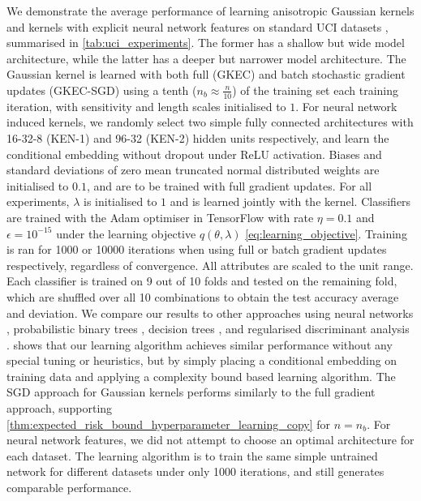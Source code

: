 \documentclass{article}
\begin{document}
		We demonstrate the average performance of learning anisotropic Gaussian kernels and kernels with explicit neural network features on standard UCI datasets \citep{bache2013uci}, summarised in \cref{tab:uci_experiments}. The former has a shallow but wide model architecture, while the latter has a deeper but narrower model architecture. The Gaussian kernel is learned with both full (GKEC) and batch stochastic gradient updates (GKEC-SGD) using a tenth ($n_{b} \approx \frac{n}{10}$) of the training set each training iteration, with sensitivity and length scales initialised to $1$. For neural network induced kernels, we randomly select two simple fully connected architectures with 16-32-8 (KEN-1) and 96-32 (KEN-2) hidden units respectively, and learn the conditional embedding without dropout under ReLU activation. Biases and standard deviations of zero mean truncated normal distributed weights are initialised to $0.1$, and are to be trained with full gradient updates. For all experiments, $\lambda$ is initialised to $1$ and is learned jointly with the kernel. Classifiers are trained with the Adam optimiser \citep{kingma2014adam} in TensorFlow \citep{abadi2016tensorflow} with rate $\eta = 0.1$ and $\epsilon = 10^{-15}$ under the learning objective $q(\theta, \lambda)$ \eqref{eq:learning_objective}. Training is ran for 1000 or 10000 iterations when using full or batch gradient updates respectively, regardless of convergence. All attributes are scaled to the unit range. Each classifier is trained on 9 out of 10 folds and tested on the remaining fold, which are shuffled over all 10 combinations to obtain the test accuracy average and deviation. We compare our results to other approaches using neural networks \citep[a; c]{kaya2016banknote, freire2009short}, probabilistic binary trees \citep[b]{horton1996probabilistic}, decision trees \citep[d]{zhou2004size}, and regularised discriminant analysis \citep[e]{aeberhard1992comparison}.  shows that our learning algorithm achieves similar performance without any special tuning or heuristics, but by simply placing a conditional embedding on training data and applying a complexity bound based learning algorithm. The SGD approach for Gaussian kernels performs similarly to the full gradient approach, supporting \cref{thm:expected_risk_bound_hyperparameter_learning_copy} for $n = n_{b}$. For neural network features, we did not attempt to choose an optimal architecture for each dataset. The learning algorithm is to train the same simple untrained network for different datasets under only 1000 iterations, and still generates comparable performance. 
	
\end{document}
